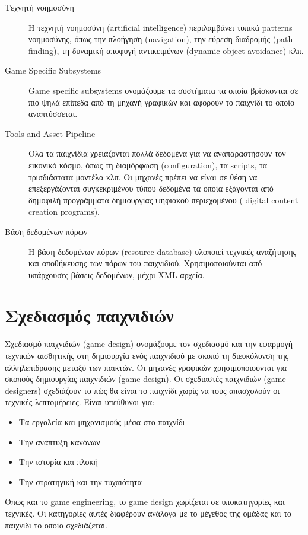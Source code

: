 \begin{description}
\item [Τεχνητή νοημοσύνη]Η τεχνητή νοημοσύνη (artificial intelligence) περιλαμβάνει τυπικά patterns νοημοσύνης, όπως την πλοήγηση (navigation), την εύρεση διαδρομής (path finding), τη δυναμική αποφυγή αντικειμένων (dynamic object avoidance) κλπ.

\item [Game Specific Subsystems]Game specific subsystems ονομάζουμε τα συστήματα τα οποία βρίσκονται σε πιο ψηλά επίπεδα από τη μηχανή γραφικών και αφορούν το παιχνίδι το οποίο αναπτύσσεται.

\item [Tools and Asset Pipeline]Όλα τα παιχνίδια χρειάζονται πολλά δεδομένα για να αναπαραστήσουν τον εικονικό κόσμο, όπως τη διαμόρφωση (configuration), τα scripts, τα τρισδιάστατα μοντέλα κλπ. Οι μηχανές πρέπει να είναι σε θέση να επεξεργάζονται συγκεκριμένου τύπου δεδομένα τα οποία εξάγονται από δημοφιλή προγράμματα δημιουργίας ψηφιακού περιεχομένου ( digital content creation programs).

\item [Βάση δεδομένων πόρων]Η βάση δεδομένων πόρων (resource database) υλοποιεί τεχνικές αναζήτησης και αποθήκευσης των πόρων του παιχνιδιού. Χρησιμοποιούνται από υπάρχουσες βάσεις δεδομένων, μέχρι \gls{XML} αρχεία. 
\end{description}

\section{Σχεδιασμός παιχνιδιών}
Σχεδιασμό παιχνιδιών (game design) ονομάζουμε τον σχεδιασμό και την εφαρμογή τεχνικών αισθητικής στη δημιουργία ενός παιχνιδιού με σκοπό τη διευκόλυνση της αλληλεπίδρασης μεταξύ των παικτών. Οι μηχανές γραφικών χρησιμοποιούνται για σκοπούς δημιουργίας παιχνιδιών (game design). Οι σχεδιαστές παιχνιδιών (game designers) σχεδιάζουν το πώς θα είναι το παιχνίδι χωρίς να τους απασχολούν οι τεχνικές λεπτομέρειες. Είναι υπεύθυνοι για:
\begin{itemize}
	\item Τα εργαλεία και μηχανισμούς μέσα στο παιχνίδι
	\item Την ανάπτυξη κανόνων
	\item Την ιστορία και πλοκή
	\item Την στρατηγική και την τυχαιότητα	
\end{itemize}

Όπως και το game engineering, το game design χωρίζεται σε υποκατηγορίες και τεχνικές. Οι κατηγορίες αυτές διαφέρουν ανάλογα με το μέγεθος της ομάδας και το παιχνίδι το οποίο σχεδιάζεται.

